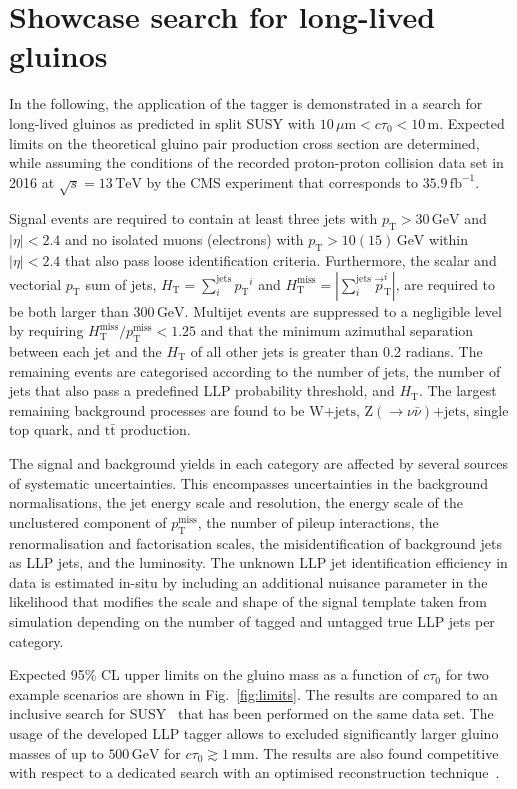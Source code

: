 \documentclass{webofc}
\newcommand{\ctau}{\ensuremath{c\tau_{0}}\xspace}
\newcommand{\pt}{\ensuremath{p_\textrm{T}}\xspace}
\newcommand{\jht}{\ensuremath{H_\textrm{T}}\xspace}
\newcommand{\jmht}{\ensuremath{H_\textrm{T}^\textrm{miss}}\xspace}
\newcommand{\met}{\ensuremath{p_\textrm{T}^\textrm{miss}}\xspace}
\newcommand{\ttbar}{\ensuremath{\textrm{t}\bar{\textrm{t}}}\xspace}
\newcommand{\wjets}{\ensuremath{\textrm{W+jets}}\xspace}
\newcommand{\znunu}{\ensuremath{\textrm{Z}(\to\nu\bar{\nu})\textrm{+jets}}\xspace}
\begin{document}
\section{Showcase search for long-lived gluinos}
\label{showcase}

In the following, the application of the tagger is demonstrated in a search for long-lived gluinos as predicted in split SUSY with $10\,\mu\textrm{m}<\ctau<10\,\textrm{m}$. Expected limits on the theoretical gluino pair production cross section are determined, while assuming the conditions of the recorded proton-proton collision data set in 2016 at $\sqrt{s}=13\,\textrm{TeV}$ by the CMS experiment that corresponds to $35.9\,\textrm{fb}^{-1}$.

Signal events are required to contain at least three jets with $\pt>30\,\textrm{GeV}$ and $|\eta|<2.4$ and no isolated muons (electrons) with $\pt>10(15)\,\textrm{GeV}$ within $|\eta|<2.4$ that also pass loose identification criteria. Furthermore, the scalar and vectorial \pt sum of jets, $\jht=\sum_{i}^\textrm{jets}\pt^{i}$ and $\jmht=|\sum_{i}^\textrm{jets}\vec{p}_\textrm{T}^{i}|$, are required to be both larger than $300\,\textrm{GeV}$. Multijet events are suppressed to a negligible level by requiring $\jmht/\met<1.25$ and that the minimum azimuthal separation between each jet and the $\jht$ of all other jets is greater than 0.2 radians. The remaining events are categorised according to the number of jets, the number of jets that also pass a predefined LLP probability threshold, and \jht. The largest remaining background processes are found to be \wjets, \znunu, single top quark, and \ttbar production. 

The signal and background yields in each category are affected by several sources of systematic uncertainties. This encompasses uncertainties in the background normalisations, the jet energy scale and resolution, the energy scale of the unclustered component of \met, the number of pileup interactions, the renormalisation and factorisation scales, the misidentification of background jets as LLP jets, and the luminosity. The unknown LLP jet identification efficiency in data is estimated in-situ by including an additional nuisance parameter in the likelihood that modifies the scale and shape of the signal template taken from simulation depending on the number of tagged and untagged true LLP jets per category.

Expected 95\% CL upper limits on the gluino mass as a function of \ctau for two example scenarios are shown in Fig.~\ref{fig:limits}. The results are compared to an inclusive search for SUSY~\cite{refsearch} that has been performed on the same data set. The usage of the developed LLP tagger allows to excluded significantly larger gluino masses of up to $500\,\textrm{GeV}$ for $\ctau\gtrsim1\,\textrm{mm}$. The results are also found competitive with respect to a dedicated search with an optimised reconstruction technique~\cite{atlasref}.
 
\end{document}
